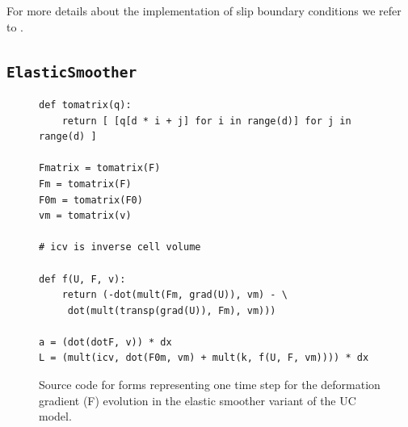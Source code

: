 For more details about the implementation of slip boundary conditions
we refer to \cite{Nazarov2009}.

\subsection{\tt ElasticSmoother}


\begin{figure}[!h]
{\small
\begin{lstlisting}
def tomatrix(q):
    return [ [q[d * i + j] for i in range(d)] for j in range(d) ]

Fmatrix = tomatrix(F)
Fm = tomatrix(F)
F0m = tomatrix(F0)
vm = tomatrix(v)

# icv is inverse cell volume

def f(U, F, v):
    return (-dot(mult(Fm, grad(U)), vm) - \
     dot(mult(transp(grad(U)), Fm), vm)))

a = (dot(dotF, v)) * dx
L = (mult(icv, dot(F0m, vm) + mult(k, f(U, F, vm)))) * dx
\end{lstlisting}
}
\caption{Source code for forms representing one time step for the deformation gradient (F) evolution in the elastic smoother variant of the UC model. }
\label{code:ElasticSmoother}
\end{figure}


